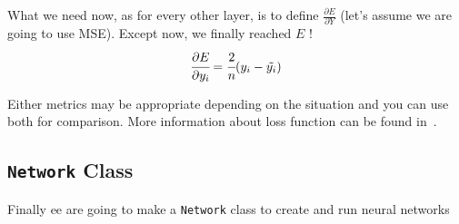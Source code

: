 What we need now, as for every other layer, is to define $\frac{\partial E}{\partial Y}$ (let's assume we are going to use MSE). Except now, we finally reached $E$ !
\begin{equation}
	\cfrac{\partial E}{\partial y_i} = \cfrac{2}{n} (y_i - \tilde{y_i}) 
\end{equation}


Either metrics may be appropriate depending on the situation and you can use both for comparison. More information about loss function can be found in~\cite{bib:loss_function}.

\subsection{\texttt{Network} Class}

Finally ee are going to make a \texttt{Network} class to create and run neural networks


